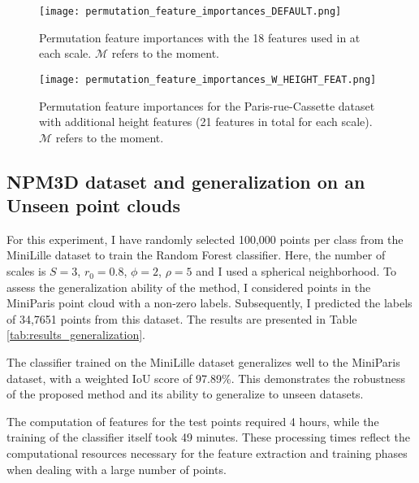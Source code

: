 \documentclass{article}
\begin{document}
\begin{figure}
    \hspace*{-2cm}
    \texttt{[image: permutation\_feature\_importances\_DEFAULT.png]}
    \caption{Permutation feature importances with the 18 features used in \cite{thomas_semantic_2018} at each scale. $\mathcal{M}$ refers to the moment.}
    \label{fig:permutation_default}
\end{figure}
\begin{figure}
    \hspace*{-2cm}
        \texttt{[image: permutation\_feature\_importances\_W\_HEIGHT\_FEAT.png]}
    \caption{Permutation feature importances for the Paris-rue-Cassette dataset with additional height features (21 features in total for each scale). $\mathcal{M}$ refers to the moment.}
    \label{fig:permutation_height}
\end{figure}




\subsection{NPM3D dataset and generalization on an Unseen point clouds}\label{sec:generalization}

For this experiment, I have randomly selected 100,000 points per class from the MiniLille dataset to train the Random Forest classifier. Here, the number of scales is $S=3$, $r_0=0.8$, $\phi=2$, $\rho=5$ and I used a spherical neighborhood. To assess the generalization ability of the method, I considered points in the MiniParis point cloud with a non-zero labels. Subsequently, I predicted the labels of 34,7651 points from this dataset. The results are presented in Table \ref{tab:results_generalization}. 

The classifier trained on the MiniLille dataset generalizes well to the MiniParis dataset, with a weighted IoU score of 97.89\%. This demonstrates the robustness of the proposed method and its ability to generalize to unseen datasets. 

The computation of features for the test points required 4 hours, while the training of the classifier itself took 49 minutes. These processing times reflect the computational resources necessary for the feature extraction and training phases when dealing with a large number of points.
\end{document}
